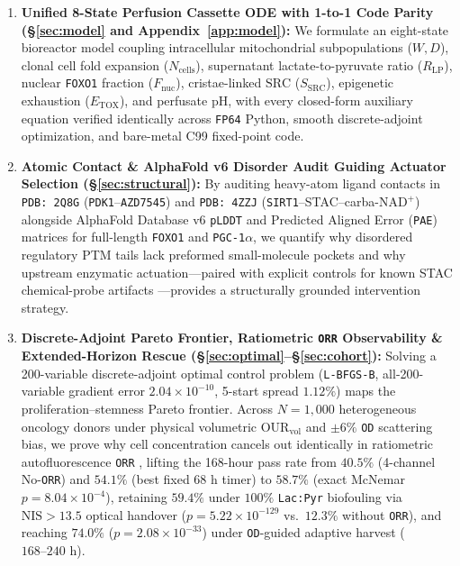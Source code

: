 \documentclass[11pt]{article}
\theoremstyle{plain}
\theoremstyle{remark}
\begin{document}
\begin{enumerate}
  \item \textbf{Unified 8-State Perfusion Cassette ODE with 1-to-1 Code Parity (\S\ref{sec:model} and Appendix~\ref{app:model}):} We formulate an eight-state bioreactor model coupling intracellular mitochondrial subpopulations ($W, D$), clonal cell fold expansion ($N_{\mathrm{cells}}$), supernatant lactate-to-pyruvate ratio ($R_{\mathrm{LP}}$), nuclear \texttt{FOXO1} fraction ($F_{\mathrm{nuc}}$), cristae-linked $\mathrm{SRC}$ ($S_{\mathrm{SRC}}$), epigenetic exhaustion ($E_{\mathrm{TOX}}$), and perfusate $\mathrm{pH}$, with every closed-form auxiliary equation verified identically across \texttt{FP64} Python, smooth discrete-adjoint optimization, and bare-metal C99 fixed-point code.
  \item \textbf{Atomic Contact \& AlphaFold v6 Disorder Audit Guiding Actuator Selection (\S\ref{sec:structural}):} By auditing heavy-atom ligand contacts in \texttt{PDB: 2Q8G} (\texttt{PDK1}--\texttt{AZD7545}) and \texttt{PDB: 4ZZJ} (\texttt{SIRT1}--STAC--carba-$\text{NAD}^+$) alongside AlphaFold Database v6 \texttt{pLDDT} and Predicted Aligned Error (\texttt{PAE}) matrices for full-length \texttt{FOXO1} and \texttt{PGC-1$\alpha$}, we quantify why disordered regulatory PTM tails lack preformed small-molecule pockets and why upstream enzymatic actuation---paired with explicit controls for known STAC chemical-probe artifacts \cite{pacholec2010sirt1,hubbard2013sirt1}---provides a structurally grounded intervention strategy.
  \item \textbf{Discrete-Adjoint Pareto Frontier, Ratiometric \texttt{ORR} Observability \& Extended-Horizon Rescue (\S\ref{sec:optimal}--\S\ref{sec:cohort}):} Solving a 200-variable discrete-adjoint optimal control problem (\texttt{L-BFGS-B}, all-200-variable gradient error $2.04 \times 10^{-10}$, 5-start spread $1.12\%$) maps the proliferation--stemness Pareto frontier. Across $N = 1{,}000$ heterogeneous oncology donors under physical volumetric $\mathrm{OUR}_{\mathrm{vol}}$ and $\pm 6\%$ \texttt{OD} scattering bias, we prove why cell concentration cancels out identically in ratiometric autofluorescence \texttt{ORR} \cite{walsh2021omi}, lifting the 168-hour pass rate from $40.5\%$ (4-channel No-\texttt{ORR}) and $54.1\%$ (best fixed $68\text{ h}$ timer) to $58.7\%$ (exact McNemar $p = 8.04 \times 10^{-4}$), retaining $59.4\%$ under $100\%$ \texttt{Lac:Pyr} biofouling via $\mathrm{NIS} > 13.5$ optical handover ($p = 5.22 \times 10^{-129}$ vs.\ $12.3\%$ without \texttt{ORR}), and reaching $74.0\%$ ($p = 2.08 \times 10^{-33}$) under \texttt{OD}-guided adaptive harvest ($168\text{--}240\text{ h}$).

\end{enumerate}
\end{document}
